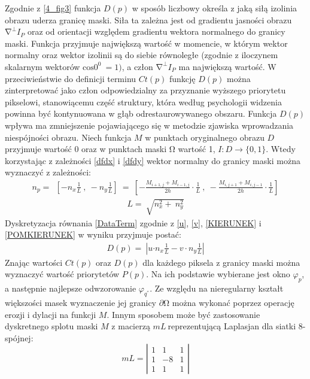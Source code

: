 \documentclass[12pt, twoside, openany]{report}
\theoremstyle{definition}
\begin{document}
Zgodnie z \autoref{4_fig3} funkcja $D\left(p\right)$ w sposób liczbowy określa z jaką siłą izolinia obrazu uderza granicę maski. Siła ta zależna jest od gradientu jasności obrazu ${\mathrm{\nabla }}^{\bot }I_P$ oraz od orientacji względem gradientu wektora normalnego do granicy maski. Funkcja przyjmuje największą wartość w momencie, w którym wektor normalny oraz wektor izolinii są do siebie równoległe (zgodnie z iloczynem skalarnym wektorów ${\mathrm{cos} 0^0\ }=1)$, a człon ${\mathrm{\nabla }}^{\bot }I_P$ ma największą wartość. W przeciwieństwie do definicji terminu $Ct(p)$ funkcję $D(p)$ można zinterpretować jako człon odpowiedzialny za przyznanie wyższego priorytetu pikselowi, stanowiącemu część struktury, która według psychologii widzenia powinna być kontynuowana w głąb odrestaurowywanego obszaru. Funkcja $D(p)$ wpływa ma zmniejszenie pojawiającego się w metodzie zjawiska wprowadzania niespójności obrazu. Niech funkcja $M$ w punktach oryginalnego obrazu $D$ przyjmuje wartość 0 oraz w punktach maski $\mathrm{\Omega }$ wartość 1, $I:D\to \{0,1\}$.  Wtedy korzystając z zależności \eqref{dfdx} i \eqref{dfdy} wektor normalny do granicy maski można wyznaczyć z zależności:
\begin{align}
n_p=\ \ \left[-n_x\frac{1}{L}\ ,\ -n_y\frac{1}{L}\right]\ =\ \left[-\frac{M_{i+1,j}+M_{i-1,j}}{2h}\cdot \frac{1}{L}\ ,\ -\frac{M_{i,j+1}+M_{i,j-1}}{2h}\cdot \frac{1}{L}\right]
\label{KIERUNEK}
\end{align}
\begin{align}
L=\ \sqrt{n^2_x+\ n^2_y}
\label{POMKIERUNEK}
\end{align}
Dyskretyzacja równania \eqref{DataTerm} zgodnie z \eqref{u}, \eqref{v}, \eqref{KIERUNEK} i \eqref{POMKIERUNEK} w wyniku przyjmuje postać:
\begin{align}
D(p)=\ \left|u{\cdot n}_x\frac{1}{L}-v\cdot n_y\frac{1}{L}\right|
\end{align}
Znając wartości $Ct\left(p\right)$ oraz $D(p)$ dla każdego piksela z granicy maski można wyznaczyć wartość priorytetów $P(p)$. Na ich podstawie wybierane jest okno ${\varphi }_p$, a następnie najlepsze odwzorowanie ${\varphi }_{q^{''}}$. Ze względu na nieregularny kształt większości masek wyznaczenie jej granicy $\partial \mathrm{\Omega }$ można wykonać poprzez operację erozji i dylacji na funkcji $M$. Innym sposobem może być zastosowanie dyskretnego splotu maski $M$ z macierzą $mL\ $reprezentującą Laplasjan dla siatki 8-spójnej: 
\begin{equation}
mL=\left| \begin{array}{ccc}
1 & 1 & 1 \\ 
1 & -8 & 1 \\ 
1 & 1 & 1 \end{array}
\right|	
\label{LAPLASJAN}
\end{equation}
\end{document}
